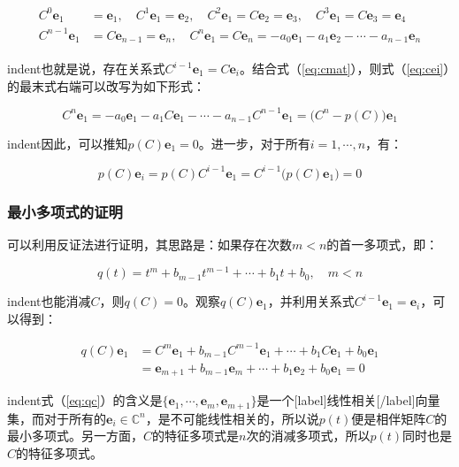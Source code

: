 \documentclass[UTF8,nofonts]{ctexart}
\begin{document}
\begin{align}
\label{eq:cei}
\begin{split}
C^{0}\boldsymbol{e}_1 &= \boldsymbol{e}_1,\quad C^{1}\boldsymbol{e}_1=\boldsymbol{e}_2,\quad C^{2}\boldsymbol{e}_1=C\boldsymbol{e}_2=\boldsymbol{e}_3,\quad C^{3}\boldsymbol{e}_1= C\boldsymbol{e}_3=\boldsymbol{e}_4\\
C^{n-1}\boldsymbol{e}_1 &= C\boldsymbol{e}_{n-1}=\boldsymbol{e}_n,\quad C^{n}\boldsymbol{e}_1=C\boldsymbol{e}_n=
-a_0\boldsymbol{e}_1-a_1\boldsymbol{e}_2-\cdots-a_{n-1}\boldsymbol{e}_n
\end{split}
\end{align}

indent也就是说，存在关系式$C^{i-1}\boldsymbol{e}_1=C\boldsymbol{e}_{i}$。结合式（\ref{eq:cmat}），则式（\ref{eq:cei}）的最末式右端可以改写为如下形式：

\[C^{n}\boldsymbol{e}_1=-a_0\boldsymbol{e}_1-a_1C\boldsymbol{e}_1-\cdots-a_{n-1}C^{n-1}\boldsymbol{e}_1=\big(C^n-p(C)\big)\boldsymbol{e}_1\]

indent因此，可以推知$p(C)\boldsymbol{e}_1=0$。进一步，对于所有$i=1,\cdots,n$，有：

\[p(C)\boldsymbol{e}_i=p(C)C^{i-1}\boldsymbol{e}_1=C^{i-1}\big(p(C)\boldsymbol{e}_1\big)=0\]

\subsubsection*{最小多项式的证明}

可以利用反证法进行证明，其思路是：如果存在次数$m<n$的首一多项式，即：

\[q(t)=t^m+b_{m-1}t^{m-1}+\cdots+b_1t+b_0,\quad m<n\]

indent也能消减$C$，则$q(C)=0$。观察$q(C)\boldsymbol{e}_1$，并利用关系式$C^{i-1}\boldsymbol{e}_1=\boldsymbol{e}_{i}$，可以得到：

\begin{align*}
\label{eq:qc}
q(C)\boldsymbol{e}_1 &=
C^m\boldsymbol{e}_1+b_{m-1}C^{m-1}\boldsymbol{e}_1+\cdots+b_1C\boldsymbol{e}_1+b_0\boldsymbol{e}_1 \\
&= \boldsymbol{e}_{m+1}+b_{m-1}\boldsymbol{e}_m+\cdots+b_1\boldsymbol{e}_2+b_0\boldsymbol{e}_1=0
\end{align*}

indent式（\ref{eq:qc}）的含义是$\{\boldsymbol{e}_1,\cdots,\boldsymbol{e}_m,\boldsymbol{e}_{m+1}\}$是一个[label]线性相关[/label]向量集，而对于所有的$\boldsymbol{e}_i\in\mathbb{C}^n$，是不可能线性相关的，所以说$p(t)$便是相伴矩阵$C$的最小多项式。另一方面，$C$的特征多项式是$n$次的消减多项式，所以$p(t)$同时也是$C$的特征多项式。
\end{document}

